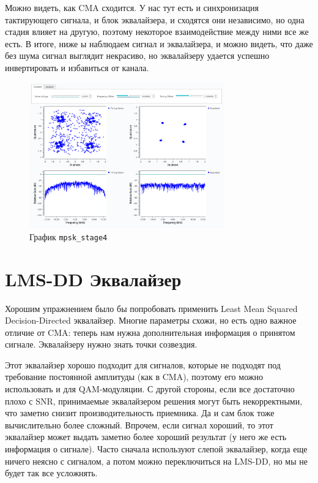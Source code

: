 \documentclass[a4paper,12pt]{report}
\begin{document}
    Можно видеть, как CMA сходится. У нас тут есть и синхронизация тактирующего сигнала, и блок эквалайзера, и сходятся они независимо, но одна стадия влияет на другую, поэтому некоторое взаимодействие между ними все же есть. В итоге, ниже ы наблюдаем сигнал  и  эквалайзера, и можно видеть, что даже без шума  сигнал выглядит некрасиво, но эквалайзеру удается успешно инвертировать и избавиться от канала.
    
    \begin{figure}[H]
        \centering
        \includegraphics[width=0.75\textwidth]{images/mpsk_stage4_plot.png}
        \caption{График \texttt{mpsk\_stage4}}
        \label{fig:mpsk_stage4_plot}
    \end{figure}
    
    \chapter{LMS-DD Эквалайзер}
    
    Хорошим упражнением было бы попробовать применить Least Mean Squared Decision-Directed эквалайзер. Многие параметры схожи, но есть одно важное отличие от CMA: теперь нам нужна дополнительная информация о принятом сигнале. Эквалайзеру нужно знать точки созвездия.
    
    Этот эквалайзер хорошо подходит для сигналов, которые не подходят под требование постоянной амплитуды (как в CMA), поэтому его можно использовать и для QAM-модуляции. С другой стороны, если все достаточно плохо с SNR, принимаемые эквалайзером решения могут быть некорректными, что заметно снизит производительность приемника. Да и сам блок тоже вычислительно более сложный. Впрочем, если сигнал хороший, то этот эквалайзер может выдать заметно более хороший результат (у него же есть информация о сигнале). Часто сначала используют слепой эквалайзер, когда еще ничего неясно с сигналом, а потом можно переключиться на LMS-DD, но мы не будет так все усложнять.
    
\end{document}
